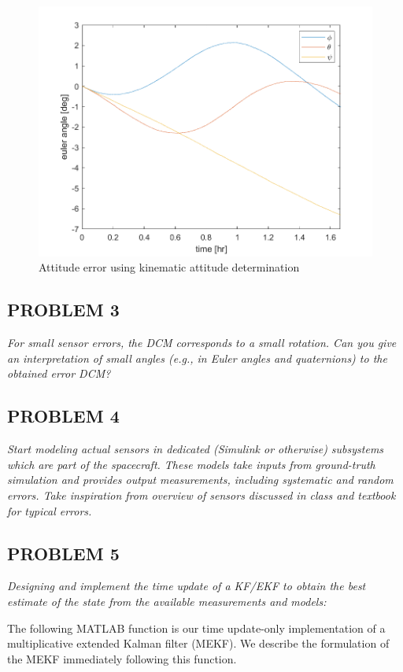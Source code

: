 \begin{figure}[H]
\centering
\includegraphics[scale=0.6]{Images/ps7_problem2_kin.png}
\caption{Attitude error using kinematic attitude determination}
\label{fig:ps7_problem2_kin}
\end{figure}

\subsection{PROBLEM 3}
\textit{For small sensor errors, the DCM corresponds to a small rotation. Can you give an interpretation of small angles (e.g., in Euler angles and quaternions) to the obtained error DCM?}

\subsection{PROBLEM 4}
\textit{Start modeling actual sensors in dedicated (Simulink or otherwise) subsystems which are part of the spacecraft. These models take inputs from ground-truth simulation and provides output measurements, including systematic and random errors. Take inspiration from overview of sensors discussed in class and textbook for typical errors.}

\subsection{PROBLEM 5}
\textit{Designing and implement the time update of a KF/EKF to obtain the best estimate of the state from the available measurements and models:}

The following MATLAB function is our time update-only implementation of a multiplicative extended Kalman filter (MEKF). We describe the formulation of the MEKF immediately following this function.

